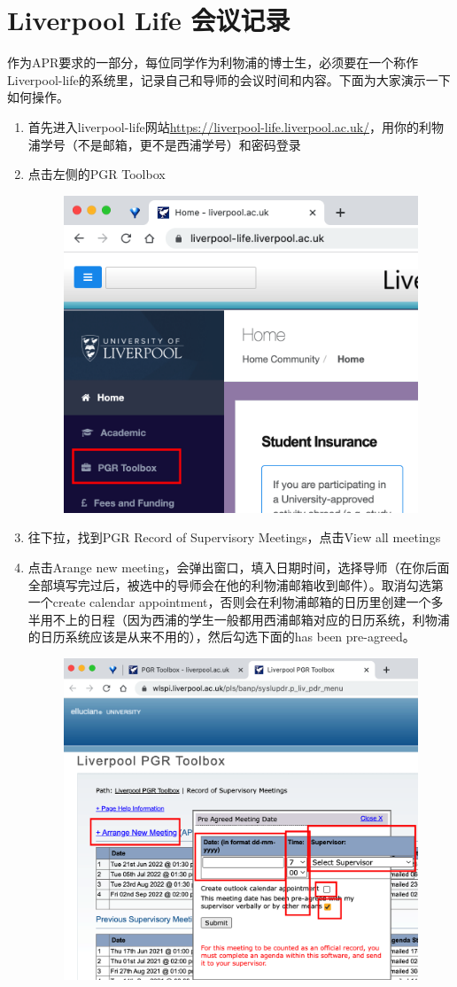 \section{Liverpool Life 会议记录}
作为APR要求的一部分，每位同学作为利物浦的博士生，必须要在一个称作Liverpool-life的系统里，记录自己和导师的会议时间和内容。下面为大家演示一下如何操作。

\begin{enumerate}
    \item 首先进入liverpool-life网站\url{https://liverpool-life.liverpool.ac.uk/}，用你的利物浦学号（不是邮箱，更不是西浦学号）和密码登录
    \item 点击左侧的PGR Toolbox
    \begin{figure}[H]
        \centering
        \includegraphics[width=0.5\columnwidth]{author-folder/Kai.Wu/meeting_record_figures/toolbox.png}
    \end{figure}
    \item 往下拉，找到PGR Record of Supervisory Meetings，点击View all meetings
    \item 点击Arange new meeting，会弹出窗口，填入日期时间，选择导师（在你后面全部填写完过后，被选中的导师会在他的利物浦邮箱收到邮件）。取消勾选第一个create calendar appointment，否则会在利物浦邮箱的日历里创建一个多半用不上的日程（因为西浦的学生一般都用西浦邮箱对应的日历系统，利物浦的日历系统应该是从来不用的），然后勾选下面的has been pre-agreed。
    \begin{figure}[H]
        \centering
        \includegraphics[width=0.5\columnwidth]{author-folder/Kai.Wu/meeting_record_figures/arange_new_meeting.png}

\end{figure}
\end{enumerate}
